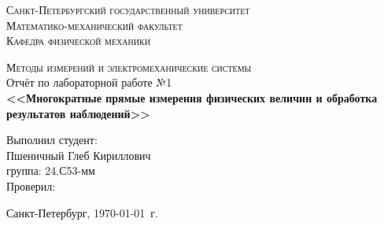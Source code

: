 \begin{titlepage}
\begin{center}
\textsc{Санкт-Петербургский государственный университет\\
Математико-механический факультет\\
Кафедра физической механики\\}

\vfill

\textsc{Методы измерений и электромеханические системы\\[3mm]}
Отчёт по лабораторной работе №1\\[6mm]


\textbf{\large<<Многократные прямые измерения физических
величин и обработка результатов наблюдений>>}

\vfill
\end{center}

\hfill
\begin{minipage}{.5\textwidth}
Выполнил студент:\\[2mm] 
Пшеничный Глеб Кириллович\\
группа: 24.С53-мм\\[5mm]

Проверил:\\[2mm] 

\end{minipage}%
\vfill
\begin{center}
 Санкт-Петербург, \yeardate\today\ г.
\end{center}
\end{titlepage}